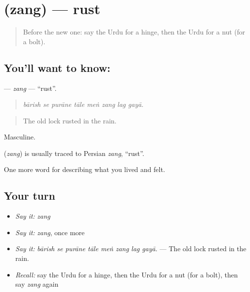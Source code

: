\section[\texorpdfstring{\ur{زنگ} (zang)}{زنگ (zang)}]{ (zang) — rust}

\label{lesson:UR-C502-zang}



\begin{quote}
Before the new one: say the Urdu for a hinge, then the Urdu for a nut (for a bolt).
\end{quote}

\subsection*{You'll want to know: }
\textbf{} — \emph{zang} — \textquotedblleft{}rust\textquotedblright{}.

\begin{quote}
       
\end{quote}

\begin{quote}
\emph{bārish se purāne tāle meṅ zang lag gayā.}
\end{quote}

\begin{quote}
The old lock rusted in the rain.
\end{quote}

Masculine.

\begin{cousinweb}
\textbf{} (\emph{zang}) is usually traced to Persian \emph{zang}, \textquotedblleft{}rust\textquotedblright{}.
\end{cousinweb}

\begin{grammarlens}[title={What you've built}]
One more word for describing what you lived and felt.
\end{grammarlens}

\subsection*{Your turn}
\begin{itemize}
\raggedright
  \item \emph{Say it:} \emph{zang}
  \item \emph{Say it:} \emph{zang}, once more
  \item \emph{Say it:} \emph{bārish se purāne tāle meṅ zang lag gayā.} — The old lock rusted in the rain.
  \item \emph{Recall:} say the Urdu for a hinge, then the Urdu for a nut (for a bolt), then say \emph{zang} again
\end{itemize}

